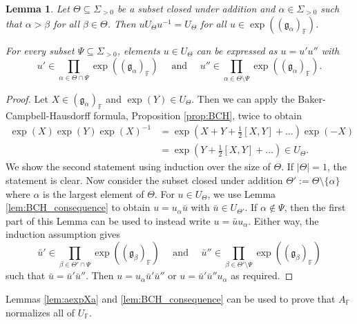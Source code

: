 \documentclass[12pt]{amsart}
\newcommand{\F}{\mathbb{F} }
\newcommand{\frakg}{\mathfrak{g}}
\numberwithin{equation}{section}
\newtheorem{lemma}[theorem]{Lemma}
\theoremstyle{remark} %
\begin{document}
\begin{lemma}\label{lem:BCH_normalizer}
	Let $\Theta \subseteq \Sigma_{>0}$ be a subset closed under addition and $\alpha \in \Sigma_{>0}$ such that $\alpha > \beta$ for all $\beta \in \Theta$. Then $uU_{\Theta}u^{-1}= U_{\Theta}$ for all $u \in \exp((\frakg_{\alpha})_\F)$.
	
	For every subset $\Psi \subseteq \Sigma_{>0}$, elements $u \in U_{\Theta}$ can be expressed as $u = u' u''$ with
	$$
	u' \in \prod_{\alpha \in \Theta \cap \Psi} \exp((\frakg_{\alpha})_\F) \quad \text{ and } \quad u'' \in \prod_{\alpha \in \Theta \setminus \Psi} \exp((\frakg_{\alpha})_\F) .
	$$ 
\end{lemma}
\begin{proof}
	Let $X \in (\frakg_{\alpha})_\F$ and $\exp(Y) \in U_{\Theta}$. Then we can apply the Baker-Campbell-Hausdorff formula, Proposition \ref{prop:BCH}, twice to obtain
	\begin{align*}
		\exp(X) \exp(Y) \exp(X)^{-1} &= \exp\left(X + Y + \frac{1}{2}[X,Y] + \ldots\right) \exp(-X)  \\
		&= \exp\left( Y + \frac{1}{2} [X,Y] + \ldots\right) \in U_\Theta.
	\end{align*}
	We show the second statement using induction over the size of $\Theta$. If $|\Theta| = 1$, the statement is clear. Now consider the subset closed under addition $\Theta' := \Theta \setminus \{\alpha\} $ where $\alpha$ is the largest element of $\Theta$. For $u \in U_\Theta$, we use Lemma \ref{lem:BCH_consequence} to obtain $u = u_\alpha \bar{u}$ with $\bar{u} \in U_{\Theta'}$. If $\alpha \notin \Psi$, then the first part of this Lemma can be used to instead write $u = \bar{u} u_\alpha$. Either way, the induction assumption gives 
	$$
		\bar{u}' \in \prod_{\beta \in \Theta' \cap \Psi} \exp((\frakg_{\beta})_\F) \quad \text{ and } \quad \bar{u}'' \in \prod_{\beta \in \Theta' \setminus \Psi} \exp((\frakg_{\beta})_\F)
	$$
	such that $\bar{u} = \bar{u}' \bar{u}''$. Then $u = u_{\alpha} \bar{u}' \bar{u}''$ or $u =  \bar{u}' \bar{u}'' u_\alpha $ as required.
\end{proof}

Lemmas \ref{lem:aexpXa} and \ref{lem:BCH_consequence} can be used to prove that $A_\F$ normalizes all of $U_\F$. 
\end{document}
